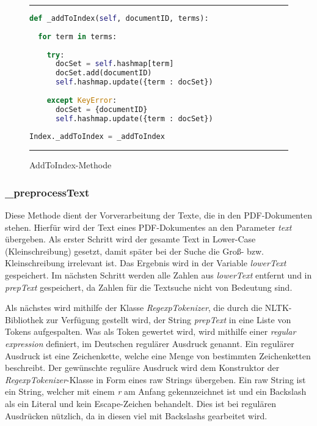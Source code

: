 \begin{figure}[h]
	\rule{\textwidth}{0.4pt}
		\begin{lstlisting}[language=Python]
def _addToIndex(self, documentID, terms):
    
  for term in terms:
        
    try:
      docSet = self.hashmap[term]
      docSet.add(documentID)
      self.hashmap.update({term : docSet})
            
    except KeyError:
      docSet = {documentID}
      self.hashmap.update({term : docSet})
    
Index._addToIndex = _addToIndex
		\end{lstlisting}
	\rule{\textwidth}{0.4pt}
	\caption{AddToIndex-Methode}
	\label{fig:addToIndex}
\end{figure}

\subsubsection{\_preprocessText}\label{preprocess}
Diese Methode dient der Vorverarbeitung der Texte, die in den PDF-Dokumenten stehen. Hierfür wird der Text eines PDF-Dokumentes an den Parameter \textit{text} übergeben. Als erster Schritt wird der gesamte Text in Lower-Case (Kleinschreibung) gesetzt, damit später bei der Suche die Groß- bzw. Kleinschreibung irrelevant ist. Das Ergebnis wird in der Variable \textit{lowerText} gespeichert. Im nächsten Schritt werden alle Zahlen aus \textit{lowerText} entfernt und in \textit{prepText} gespeichert, da Zahlen für die Textsuche nicht von Bedeutung sind.

Als nächstes wird mithilfe der Klasse \textit{RegexpTokenizer}, die durch die NLTK-Bibliothek zur Verfügung gestellt wird, der String \textit{prepText} in eine Liste von Tokens aufgespalten. Was als Token gewertet wird, wird mithilfe einer \textit{regular expression} definiert, im Deutschen regulärer Ausdruck genannt. Ein regulärer Ausdruck ist eine Zeichenkette, welche eine Menge von bestimmten Zeichenketten beschreibt. Der gewünschte reguläre Ausdruck wird dem Konstruktor der \textit{RegexpTokenizer}-Klasse in Form eines raw Strings übergeben. Ein raw String ist ein String, welcher mit einem \textit{r} am Anfang gekennzeichnet ist und ein Backslash als ein Literal und kein Escape-Zeichen behandelt. Dies ist bei regulären Ausdrücken nützlich, da in diesen viel mit Backslashs gearbeitet wird.

